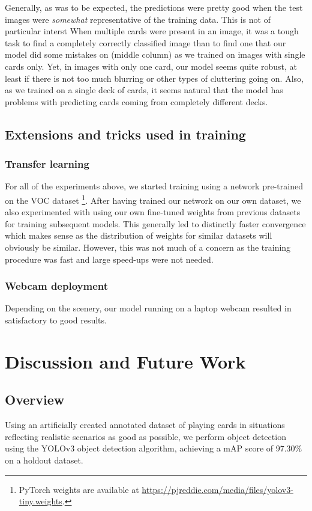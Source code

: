 \documentclass[a4paper]{article}
\begin{document}
Generally, as was to be expected, the predictions were pretty good when the test images were \textit{somewhat} representative of the training data. This is not of particular interst
When multiple cards were present in an image, it was a tough task to find a completely correctly classified image than to find one that our model did some mistakes on (middle column) as we trained on images with single cards only. Yet, in images with only one card, our model seems quite robust, at least if there is not too much blurring or other types of cluttering going on. Also, as we trained on a single deck of cards, it seems natural that the model has problems with predicting cards coming from completely different decks.
\subsection*{Extensions and tricks used in training}
\subsubsection*{Transfer learning}
For all of the experiments above, we started training using a network pre-trained on the VOC dataset \cite{Everingham15} \footnote{PyTorch weights are available at \url{https://pjreddie.com/media/files/yolov3-tiny.weights}.}. After having trained our network on our own dataset, we also experimented with using our own fine-tuned weights from previous datasets for training subsequent models. This generally led to distinctly faster convergence which makes sense as the distribution of weights for similar datasets will obviously be similar. However, this was not much of a concern as the training procedure was fast and large speed-ups were not needed.
\subsubsection*{Webcam deployment}
Depending on the scenery, our model running on a laptop webcam resulted in satisfactory to good results.
\section{Discussion and Future Work}
\subsection{Overview}
Using an artificially created annotated dataset of playing cards in situations reflecting realistic scenarios as good as possible, we perform object detection using the YOLOv3 object detection algorithm, achieving a mAP score of 97.30\% on a holdout dataset. \\ 
\end{document}
